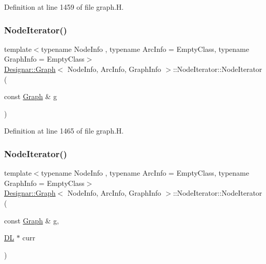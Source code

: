 Definition at line 1459 of file graph.\+H.

\mbox{\label{class_designar_1_1_graph_1_1_node_iterator_a646f28f9dbd99df7317dd0cf22122f42}} 
\subsubsection{\texorpdfstring{Node\+Iterator()}{NodeIterator()}\hspace{0.1cm}{\footnotesize\ttfamily [2/5]}}
{\footnotesize\ttfamily template$<$typename Node\+Info , typename Arc\+Info  = Empty\+Class, typename Graph\+Info  = Empty\+Class$>$ \\
\hyperlink{class_designar_1_1_graph}{Designar\+::\+Graph}$<$ Node\+Info, Arc\+Info, Graph\+Info $>$\+::Node\+Iterator\+::\+Node\+Iterator (\begin{DoxyParamCaption}\item[{const \hyperlink{class_designar_1_1_graph}{Graph} \&}]{g }\end{DoxyParamCaption})\hspace{0.3cm}{\ttfamily [inline]}}



Definition at line 1465 of file graph.\+H.

\mbox{\label{class_designar_1_1_graph_1_1_node_iterator_abc568563840c41429af62d925d45afc6}} 
\subsubsection{\texorpdfstring{Node\+Iterator()}{NodeIterator()}\hspace{0.1cm}{\footnotesize\ttfamily [3/5]}}
{\footnotesize\ttfamily template$<$typename Node\+Info , typename Arc\+Info  = Empty\+Class, typename Graph\+Info  = Empty\+Class$>$ \\
\hyperlink{class_designar_1_1_graph}{Designar\+::\+Graph}$<$ Node\+Info, Arc\+Info, Graph\+Info $>$\+::Node\+Iterator\+::\+Node\+Iterator (\begin{DoxyParamCaption}\item[{const \hyperlink{class_designar_1_1_graph}{Graph} \&}]{g,  }\item[{\hyperlink{class_designar_1_1_d_l}{DL} $\ast$}]{curr }\end{DoxyParamCaption})\hspace{0.3cm}{\ttfamily [inline]}}



